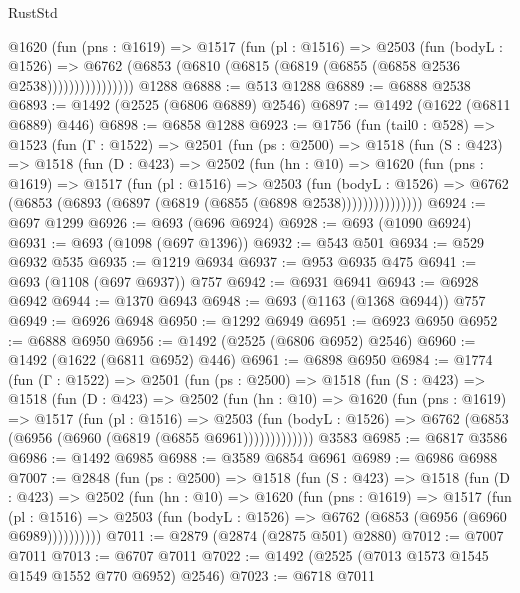 \begin{lexlean}{RustStd}
\begin{coremodule}
{\begin{coremodule}
{{{{{{{{{{{{{                @1620
                  (fun (pns : @1619) =>
                  @1517
                    (fun (pl : @1516) =>
                    @2503
                      (fun (bodyL : @1526) =>
                      @6762 (@6853 (@6810 (@6815 (@6819 (@6855 (@6858 @2536 @2538))))))))))))))))
    @1288
@6888 := @513 @1288
@6889 := @6888 @2538
@6893 := @1492 (@2525 (@6806 @6889) @2546)
@6897 := @1492 (@1622 (@6811 @6889) @446)
@6898 := @6858 @1288
@6923 := @1756
    (fun (tail0 : @528) =>
    @1523
      (fun (Γ : @1522) =>
      @2501
        (fun (ps : @2500) =>
        @1518
          (fun (S : @423) =>
          @1518
            (fun (D : @423) =>
            @2502
              (fun (hn : @10) =>
              @1620
                (fun (pns : @1619) =>
                @1517
                  (fun (pl : @1516) =>
                  @2503
                    (fun (bodyL : @1526) =>
                    @6762 (@6853 (@6893 (@6897 (@6819 (@6855 (@6898 @2538)))))))))))))))
@6924 := @697 @1299
@6926 := @693 (@696 @6924)
@6928 := @693 (@1090 @6924)
@6931 := @693 (@1098 (@697 @1396))
@6932 := @543 @501
@6934 := @529 @6932 @535
@6935 := @1219 @6934
@6937 := @953 @6935 @475
@6941 := @693 (@1108 (@697 @6937)) @757
@6942 := @6931 @6941
@6943 := @6928 @6942
@6944 := @1370 @6943
@6948 := @693 (@1163 (@1368 @6944)) @757
@6949 := @6926 @6948
@6950 := @1292 @6949
@6951 := @6923 @6950
@6952 := @6888 @6950
@6956 := @1492 (@2525 (@6806 @6952) @2546)
@6960 := @1492 (@1622 (@6811 @6952) @446)
@6961 := @6898 @6950
@6984 := @1774
    (fun (Γ : @1522) =>
    @2501
      (fun (ps : @2500) =>
      @1518
        (fun (S : @423) =>
        @1518
          (fun (D : @423) =>
          @2502
            (fun (hn : @10) =>
            @1620
              (fun (pns : @1619) =>
              @1517
                (fun (pl : @1516) =>
                @2503
                  (fun (bodyL : @1526) =>
                  @6762 (@6853 (@6956 (@6960 (@6819 (@6855 @6961)))))))))))))
    @3583
@6985 := @6817 @3586
@6986 := @1492 @6985
@6988 := @3589 @6854 @6961
@6989 := @6986 @6988
@7007 := @2848
    (fun (ps : @2500) =>
    @1518
      (fun (S : @423) =>
      @1518
        (fun (D : @423) =>
        @2502
          (fun (hn : @10) =>
          @1620
            (fun (pns : @1619) =>
            @1517
              (fun (pl : @1516) =>
              @2503 (fun (bodyL : @1526) => @6762 (@6853 (@6956 (@6960 @6989))))))))))
@7011 := @2879 (@2874 (@2875 @501) @2880)
@7012 := @7007 @7011
@7013 := @6707 @7011
@7022 := @1492 (@2525 (@7013 @1573 @1545 @1549 @1552 @770 @6952) @2546)
@7023 := @6718 @7011
}}}}}}}}}}}}}
\end{coremodule}}
\end{coremodule}
\end{lexlean}

